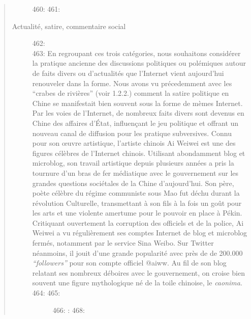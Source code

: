 \begin{quote}
\begin{description}
460: 
461: \item[Actualit\'e, satire, commentaire social]
462: \hfill \\
463: En regroupant ces trois cat\'egories, nous souhaitons consid\'erer la pratique ancienne des discussions politiques ou pol\'emiques autour de faits divers ou d{\textquoteright}actualit\'es que l{\textquoteright}Internet vient aujourd{\textquoteright}hui renouveler dans la forme. Nous avons vu pr\'ecedemment avec les {\textquotedblleft}crabes de rivi\`eres{\textquotedblright} (voir 1.2.2.) \textcolor[rgb]{0.0,0.0,0.039215688}{comment la satire politique en Chine se manifestait bien souvent sous la forme de m\`emes Internet. Par les voies de l{\textquoteright}Internet, }de nombreux faits divers sont devenus en Chine des affaires d{\textquoteright}\'Etat, influen\c{c}ant le jeu politique et offrant un nouveau canal de diffusion pour les pratique subversives. Connu pour son {\oe}uvre artistique, l{\textquoteright}artiste chinois Ai Weiwei est une des figures c\'el\`ebres de l{\textquoteright}Internet chinois. Utilisant abondamment blog et microblog, son travail artistique depuis plusieurs ann\'ees a pris la tournure d{\textquoteright}un bras de fer m\'ediatique avec le gouvernement sur les grandes questions soci\'etales de la Chine d{\textquoteright}aujourd{\textquoteright}hui. Son p\`ere, po\`ete c\'el\`ebre du r\'egime communiste sous Mao fut d\'echu durant la r\'evolution Culturelle, transmettant \`a son fils \`a la fois un go\^ut pour les arts et une violente amertume pour le pouvoir en place \`a P\'ekin. Critiquant ouvertement la corruption des officiels et de la police, Ai Weiwei a vu r\'eguli\`erement ses comptes Internet de blog et microblog ferm\'es, notamment par le service Sina Weibo. Sur Twitter n\'eanmoins, il jouit d{\textquoteright}une grande popularit\'e avec pr\`es de de 200.000 \textit{{\textquotedblleft}followers{\textquotedblright}} pour son compte officiel @aiww. Au fil de son blog relatant ses nombreux d\'eboires avec le gouvernement, on croise bien souvent une figure mythologique n\'e de la toile chinoise, le \textit{caonima}.  
464: 
465: \begin{figure}
466:     :     
468:     
\end{figure}
\end{description}
\end{quote}
